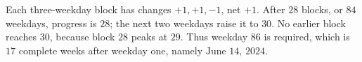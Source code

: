 Each three-weekday block has changes $+1,+1,-1$, net $+1$. After $28$ blocks, or $84$ weekdays, progress is $28$; the next two weekdays raise it to $30$. No earlier block reaches $30$, because block $28$ peaks at $29$. Thus weekday $86$ is required, which is $17$ complete weeks after weekday one, namely $\boxed{\text{June 14, 2024}}$.
